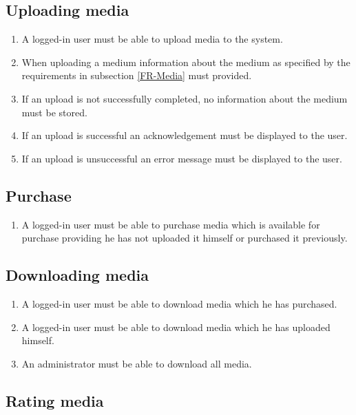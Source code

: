 \subsection {Uploading media}

\begin{enumerate}[label=FR-\twodigits*, resume]
	\item A logged-in user must be able to upload media to the system.
	\item When uploading a medium information about the medium as specified by the requirements in subsection \ref{FR-Media} must provided.
	\item If an upload is not successfully completed, no information about the medium must be stored.
	\item If an upload is successful an acknowledgement must be displayed to the user.
	\item If an upload is unsuccessful an error message must be displayed to the user. 
\end{enumerate}

\subsection {Purchase}

\begin{enumerate}[label=FR-\twodigits*, resume]
	\item A logged-in user must be able to purchase media which is available for purchase providing he has not uploaded it himself or  purchased it previously.
\end{enumerate}

\subsection {Downloading media}

\begin{enumerate}[label=FR-\twodigits*, resume]
	\item A logged-in user must be able to download media which he has purchased.
	\item A logged-in user must be able to download media which he has uploaded himself.
	\item An administrator must be able to download all media.
\end{enumerate}
		
\subsection {Rating media} \label{FR-RatingMedia}

